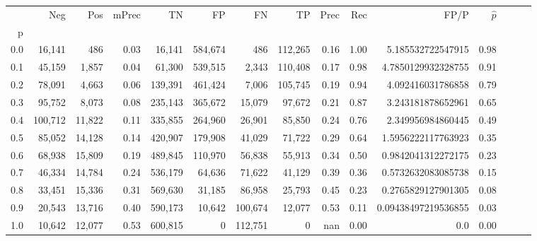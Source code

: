 \begin{tabular}{rrrrrrrrrrrrrrr}
\toprule
{} &      Neg &     Pos & mPrec &       TN &       FP &       FN &       TP &  Prec &   Rec &                 FP/P & $\hat{p}$ \\
p   &          &         &       &          &          &          &          &       &       &                      &           \\
\midrule
0.0 &   16,141 &     486 &  0.03 &   16,141 &  584,674 &      486 &  112,265 &  0.16 &  1.00 &    5.185532722547915 &      0.98 \\
0.1 &   45,159 &   1,857 &  0.04 &   61,300 &  539,515 &    2,343 &  110,408 &  0.17 &  0.98 &   4.7850129932328755 &      0.91 \\
0.2 &   78,091 &   4,663 &  0.06 &  139,391 &  461,424 &    7,006 &  105,745 &  0.19 &  0.94 &    4.092416031786858 &      0.79 \\
0.3 &   95,752 &   8,073 &  0.08 &  235,143 &  365,672 &   15,079 &   97,672 &  0.21 &  0.87 &    3.243181878652961 &      0.65 \\
0.4 &  100,712 &  11,822 &  0.11 &  335,855 &  264,960 &   26,901 &   85,850 &  0.24 &  0.76 &    2.349956984860445 &      0.49 \\
0.5 &   85,052 &  14,128 &  0.14 &  420,907 &  179,908 &   41,029 &   71,722 &  0.29 &  0.64 &   1.5956222117763923 &      0.35 \\
0.6 &   68,938 &  15,809 &  0.19 &  489,845 &  110,970 &   56,838 &   55,913 &  0.34 &  0.50 &   0.9842041312272175 &      0.23 \\
0.7 &   46,334 &  14,784 &  0.24 &  536,179 &   64,636 &   71,622 &   41,129 &  0.39 &  0.36 &   0.5732632083085738 &      0.15 \\
0.8 &   33,451 &  15,336 &  0.31 &  569,630 &   31,185 &   86,958 &   25,793 &  0.45 &  0.23 &   0.2765829127901305 &      0.08 \\
0.9 &   20,543 &  13,716 &  0.40 &  590,173 &   10,642 &  100,674 &   12,077 &  0.53 &  0.11 &  0.09438497219536855 &      0.03 \\
1.0 &   10,642 &  12,077 &  0.53 &  600,815 &        0 &  112,751 &        0 &   nan &  0.00 &                  0.0 &      0.00 \\
\bottomrule
\end{tabular}
